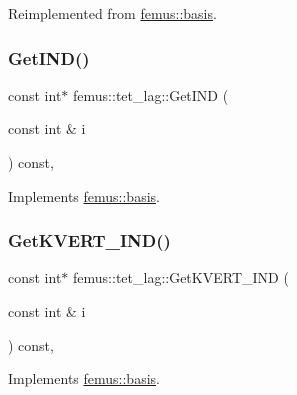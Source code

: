 Reimplemented from \mbox{\hyperlink{classfemus_1_1basis_a2ba867dcfa634c47f1c52caddd9bfdba}{femus\+::basis}}.

\mbox{\label{classfemus_1_1tet__lag_ad7c531de0360446b1ef3abc2e8c76229}} 
\subsubsection{\texorpdfstring{Get\+I\+N\+D()}{GetIND()}}
{\footnotesize\ttfamily const int$\ast$ femus\+::tet\+\_\+lag\+::\+Get\+I\+ND (\begin{DoxyParamCaption}\item[{const int \&}]{i }\end{DoxyParamCaption}) const\hspace{0.3cm}{\ttfamily [inline]}, {\ttfamily [virtual]}}



Implements \mbox{\hyperlink{classfemus_1_1basis_a3f63ad97ce70cd4a1196ede69f1f144b}{femus\+::basis}}.

\mbox{\label{classfemus_1_1tet__lag_a6fe6b8ef67dd6799487fc1acff5b36de}} 
\subsubsection{\texorpdfstring{Get\+K\+V\+E\+R\+T\+\_\+\+I\+N\+D()}{GetKVERT\_IND()}}
{\footnotesize\ttfamily const int$\ast$ femus\+::tet\+\_\+lag\+::\+Get\+K\+V\+E\+R\+T\+\_\+\+I\+ND (\begin{DoxyParamCaption}\item[{const int \&}]{i }\end{DoxyParamCaption}) const\hspace{0.3cm}{\ttfamily [inline]}, {\ttfamily [virtual]}}



Implements \mbox{\hyperlink{classfemus_1_1basis_a95ceb3feae4c484b0baa6a4d35d38909}{femus\+::basis}}.

\mbox{\label{classfemus_1_1tet__lag_a9dd1283cbaae6b1203ec9b4082267fb2}} 
